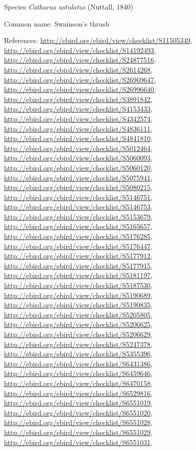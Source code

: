 \documentclass[9pt, article]{memoir}
\begin{document}
\begin{multicols}{2}
\vspace{6pt}\noindent\hspace{36pt}Species \textit{Catharus ustulatus} (Nuttall, 1840)


Common name: Swainson's thrush

References: 
\url{http://ebird.org/ebird/view/checklist/S11505349}, 
\url{http://ebird.org/ebird/view/checklist/S14192493}, 
\url{http://ebird.org/ebird/view/checklist/S24877516}, 
\url{http://ebird.org/ebird/view/checklist/S2614268}, 
\url{http://ebird.org/ebird/view/checklist/S26969647}, 
\url{http://ebird.org/ebird/view/checklist/S26996640}, 
\url{http://ebird.org/ebird/view/checklist/S3891842}, 
\url{http://ebird.org/ebird/view/checklist/S4153433}, 
\url{http://ebird.org/ebird/view/checklist/S4342574}, 
\url{http://ebird.org/ebird/view/checklist/S4836111}, 
\url{http://ebird.org/ebird/view/checklist/S4841810}, 
\url{http://ebird.org/ebird/view/checklist/S5012464}, 
\url{http://ebird.org/ebird/view/checklist/S5060093}, 
\url{http://ebird.org/ebird/view/checklist/S5060120}, 
\url{http://ebird.org/ebird/view/checklist/S5075941}, 
\url{http://ebird.org/ebird/view/checklist/S5080215}, 
\url{http://ebird.org/ebird/view/checklist/S5146751}, 
\url{http://ebird.org/ebird/view/checklist/S5146753}, 
\url{http://ebird.org/ebird/view/checklist/S5153679}, 
\url{http://ebird.org/ebird/view/checklist/S5165657}, 
\url{http://ebird.org/ebird/view/checklist/S5176285}, 
\url{http://ebird.org/ebird/view/checklist/S5176447}, 
\url{http://ebird.org/ebird/view/checklist/S5177912}, 
\url{http://ebird.org/ebird/view/checklist/S5177915}, 
\url{http://ebird.org/ebird/view/checklist/S5181197}, 
\url{http://ebird.org/ebird/view/checklist/S5187530}, 
\url{http://ebird.org/ebird/view/checklist/S5190689}, 
\url{http://ebird.org/ebird/view/checklist/S5190835}, 
\url{http://ebird.org/ebird/view/checklist/S5205805}, 
\url{http://ebird.org/ebird/view/checklist/S5206625}, 
\url{http://ebird.org/ebird/view/checklist/S5206629}, 
\url{http://ebird.org/ebird/view/checklist/S5247378}, 
\url{http://ebird.org/ebird/view/checklist/S5355396}, 
\url{http://ebird.org/ebird/view/checklist/S6431386}, 
\url{http://ebird.org/ebird/view/checklist/S6459646}, 
\url{http://ebird.org/ebird/view/checklist/S6470158}, 
\url{http://ebird.org/ebird/view/checklist/S6529816}, 
\url{http://ebird.org/ebird/view/checklist/S6551019}, 
\url{http://ebird.org/ebird/view/checklist/S6551020}, 
\url{http://ebird.org/ebird/view/checklist/S6551028}, 
\url{http://ebird.org/ebird/view/checklist/S6551029}, 
\url{http://ebird.org/ebird/view/checklist/S6551031}, 

\end{multicols}
\end{document}
